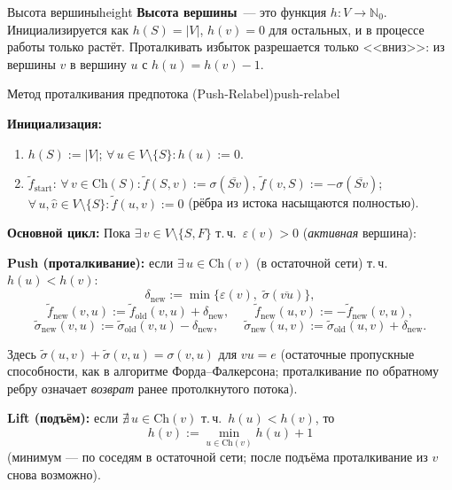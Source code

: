 \begin{defn}{Высота вершины}{height}
\textbf{Высота вершины}~--- это функция $h\colon V \to \mathbb{N}_0$.
Инициализируется как $h(S) = |V|$, $h(v) = 0$ для остальных, и в
процессе работы только растёт. Проталкивать избыток разрешается
только <<вниз>>: из вершины $v$ в вершину $u$ с $h(u) = h(v) - 1$.
\end{defn}

\begin{algo}{Метод проталкивания предпотока (Push-Relabel)}{push-relabel}

\textbf{Инициализация:}
\begin{enumerate}
  \item $h(S) := |V|$; \quad $\forall\, u \in V \setminus \{S\}\colon h(u) := 0$.
  \item $\tilde{f}_{\text{start}}$: $\forall\, v \in \mathrm{Ch}(S)\colon \tilde{f}(S, v) := \sigma(\overline{Sv})$, \quad $\tilde{f}(v, S) := -\sigma(\overline{Sv})$; \\
        $\forall\, u, \hat{v} \in V \setminus \{S\}\colon \tilde{f}(u,v) := 0$
        \quad (рёбра из истока насыщаются полностью).
\end{enumerate}

\textbf{Основной цикл:} Пока $\exists\, v \in V \setminus \{S, F\}$ т.\,ч.\ $\varepsilon(v) > 0$ (\emph{активная} вершина):

\medskip
\textbf{Push (проталкивание):}
если $\exists\, u \in \mathrm{Ch}(v)$ (в остаточной сети) т.\,ч.\ $h(u) < h(v)$:
\[
  \delta_{\text{new}} := \min\bigl\{\varepsilon(v),\; \tilde{\sigma}(\overline{vu})\bigr\},
\]
\[
  \tilde{f}_{\text{new}}(v,u) := \tilde{f}_{\text{old}}(v,u) + \delta_{\text{new}}, \qquad
  \tilde{f}_{\text{new}}(u,v) := -\tilde{f}_{\text{new}}(v,u),
\]
\[
  \tilde{\sigma}_{\text{new}}(v,u) := \tilde{\sigma}_{\text{old}}(v,u) - \delta_{\text{new}}, \qquad
  \tilde{\sigma}_{\text{new}}(u,v) := \tilde{\sigma}_{\text{old}}(u,v) + \delta_{\text{new}}.
\]

Здесь $\tilde{\sigma}(u,v) + \tilde{\sigma}(v,u) = \sigma(v,u)$ для $vu = e$
(остаточные пропускные способности, как в алгоритме Форда--Фалкерсона;
проталкивание по обратному ребру означает \emph{возврат} ранее
протолкнутого потока).

\medskip
\textbf{Lift (подъём):}
если $\nexists\, u \in \mathrm{Ch}(v)$ т.\,ч.\ $h(u) < h(v)$, то
\[
  h(v) := \min_{u \in \mathrm{Ch}(v)} h(u) + 1
\]
(минимум --- по соседям в остаточной сети; после подъёма проталкивание
из $v$ снова возможно).


\end{algo}
